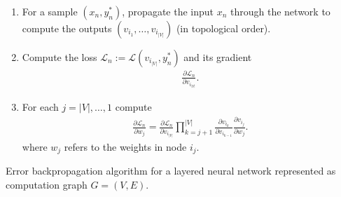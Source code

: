 \documentclass[12pt,a4paper]{article}
\begin{document}
\begin{algorithm}[h]
  \small
  \begin{enumerate}[(1)]
    \item For a sample $(x_n ,y^*_n)$, propagate the input $x_n$ through the
    network to compute the outputs $(v_{i_1}, \ldots, v_{i_{|V|}})$ (in topological order).
    \vspace{-6px}
    \item Compute the loss $\mathcal{L}_n := \mathcal{L}(v_{i_{|V|}}, y_n^*)$
    and its gradient
    \begin{align}
      \frac{\partial \mathcal{L}_n}{\partial v_{i_{|V|}}}.
    \end{align}
    \vspace{-6px}
    \item For each $j = |V|,\ldots,1$ compute
    \begin{align}
      \frac{\partial \mathcal{L}_n}{\partial w_j} =
      \frac{\partial \mathcal{L}_n}{\partial v_{i_{|V|}}} \prod_{k = j + 1}^{|V|} \frac{\partial v_{i_k}}{\partial v_{i_{k - 1}}}
      \frac{\partial v_{i_j}}{\partial w_j}.
    \end{align}
    where $w_j$ refers to the weights in node $i_j$.
    \vspace{-12px}
  \end{enumerate}
  \caption{Error backpropagation algorithm for a layered neural network
  represented as computation graph $G = (V,E)$.}
\end{algorithm}
\end{document}
